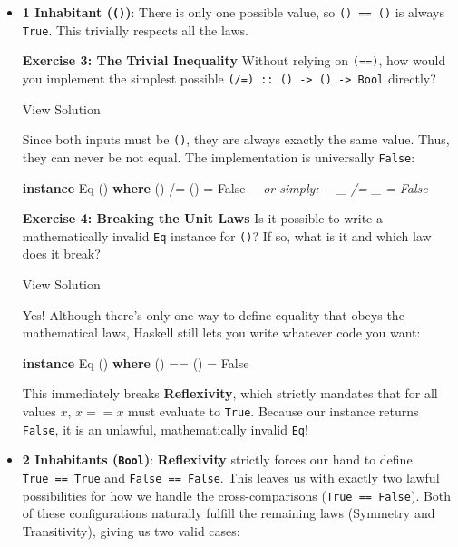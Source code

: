 \documentclass[
]{article}
\newenvironment{Shaded}{}{}
\newcommand{\CommentTok}[1]{\textcolor[rgb]{0.38,0.63,0.69}{\textit{#1}}}
\newcommand{\DataTypeTok}[1]{\textcolor[rgb]{0.56,0.13,0.00}{#1}}
\newcommand{\KeywordTok}[1]{\textcolor[rgb]{0.00,0.44,0.13}{\textbf{#1}}}
\newcommand{\NormalTok}[1]{#1}
\newcommand{\OperatorTok}[1]{\textcolor[rgb]{0.40,0.40,0.40}{#1}}
\newcommand{\OtherTok}[1]{\textcolor[rgb]{0.00,0.44,0.13}{#1}}
\begin{document}
\begin{itemize}
\item
  \textbf{1 Inhabitant (\texttt{()})}: There is only one possible value,
  so \texttt{()\ ==\ ()} is always \texttt{True}. This trivially
  respects all the laws.

  \textbf{Exercise 3: The Trivial Inequality} Without relying on
  \texttt{(==)}, how would you implement the simplest possible
  \texttt{(/=)\ ::\ ()\ -\textgreater{}\ ()\ -\textgreater{}\ Bool}
  directly?

  View Solution

  Since both inputs must be \texttt{()}, they are always exactly the
  same value. Thus, they can never be not equal. The implementation is
  universally \texttt{False}:

\begin{Shaded}
\begin{Highlighting}[]
\KeywordTok{instance} \DataTypeTok{Eq}\NormalTok{ () }\KeywordTok{where}
\NormalTok{    () }\OperatorTok{/=}\NormalTok{ () }\OtherTok{=} \DataTypeTok{False}
\CommentTok{{-}{-} or simply:}
\CommentTok{{-}{-}  \_ /= \_ = False}
\end{Highlighting}
\end{Shaded}

  \textbf{Exercise 4: Breaking the Unit Laws} Is it possible to write a
  mathematically invalid \texttt{Eq} instance for \texttt{()}? If so,
  what is it and which law does it break?

  View Solution

  Yes! Although there's only one way to define equality that obeys the
  mathematical laws, Haskell still lets you write whatever code you
  want:

\begin{Shaded}
\begin{Highlighting}[]
\KeywordTok{instance} \DataTypeTok{Eq}\NormalTok{ () }\KeywordTok{where}
\NormalTok{    () }\OperatorTok{==}\NormalTok{ () }\OtherTok{=} \DataTypeTok{False}
\end{Highlighting}
\end{Shaded}

  This immediately breaks \textbf{Reflexivity}, which strictly mandates
  that for all values \(x\), \(x == x\) must evaluate to \texttt{True}.
  Because our instance returns \texttt{False}, it is an unlawful,
  mathematically invalid \texttt{Eq}!
\item
  \textbf{2 Inhabitants (\texttt{Bool})}: \textbf{Reflexivity} strictly
  forces our hand to define \texttt{True\ ==\ True} and
  \texttt{False\ ==\ False}. This leaves us with exactly two lawful
  possibilities for how we handle the cross-comparisons
  (\texttt{True\ ==\ False}). Both of these configurations naturally
  fulfill the remaining laws (Symmetry and Transitivity), giving us two
  valid cases:


\end{itemize}
\end{document}

